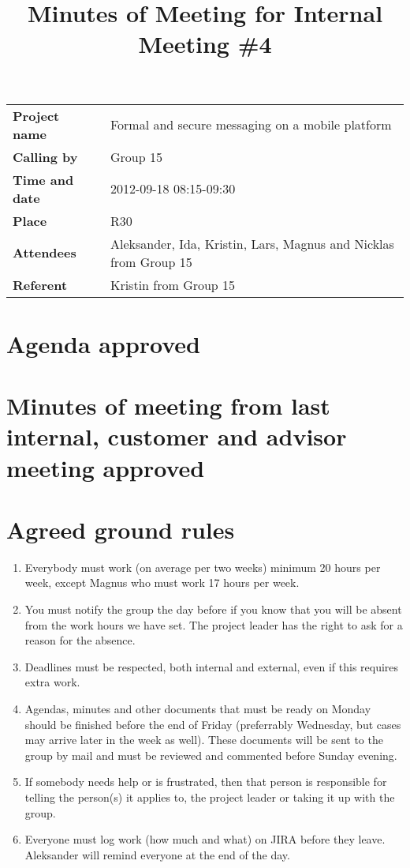 \documentclass[a4paper,12pt]{article}
\begin{document}
\title{Minutes of Meeting for Internal Meeting \#4}
\maketitle
\begin{tabular}{>{\bfseries}l l}	
Project name&Formal and secure messaging on a mobile platform\\
Calling by&Group 15\\
Time and date&2012-09-18 08:15-09:30\\
Place&R30\\
Attendees&Aleksander, Ida, Kristin, Lars, Magnus and Nicklas from Group 15\\
Referent&Kristin from Group 15\\
\end{tabular}

\section{Agenda approved}
\section{Minutes of meeting from last internal, customer and advisor meeting approved}
\section{Agreed ground rules}
\begin{enumerate}
\item
Everybody must work (on average per two weeks) minimum 20 hours per week, except Magnus who must work 17 hours per week.
\item
You must notify the group the day before if you know that you will be absent from the work hours we have set. The project leader has the right to ask for a reason for the absence.
\item
Deadlines must be respected, both internal and external, even if this requires extra work.
\item
Agendas, minutes and other documents that must be ready on Monday should be finished before the end of Friday (preferrably Wednesday, but cases may arrive later in the week as well). These documents will be sent to the group by mail and must be reviewed
and commented before Sunday evening.
\item
If somebody needs help or is frustrated, then that person is responsible for telling the person(s) it applies to, the project
leader or taking it up with the group. 
\item
Everyone must log work (how much and what) on JIRA before they leave. Aleksander will remind everyone at the end of the day.
\end{enumerate}
\end{document}

